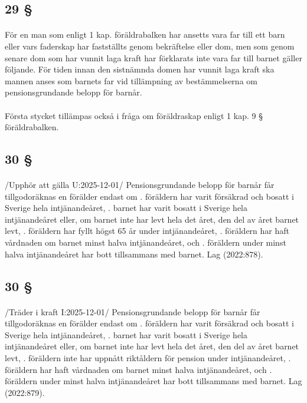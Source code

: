 \documentclass[a4paper,notitlepage,openany,10pt]{book}
\begin{document}
\subsection*{29 §}
\paragraph*{}
För en man som enligt 1 kap. föräldrabalken har ansetts vara far till ett barn eller vars faderskap har fastställts genom bekräftelse eller dom, men som genom senare dom som har vunnit laga kraft har förklarats inte vara far till barnet gäller följande. För tiden innan den sistnämnda domen har vunnit laga kraft ska mannen anses som barnets far vid tillämpning av bestämmelserna om pensionsgrundande belopp för barnår.
\paragraph*{}
Första stycket tillämpas också i fråga om föräldraskap enligt 1 kap. 9 § föräldrabalken.
\subsection*{30 §}
\paragraph*{}
/Upphör att gälla U:2025-12-01/
Pensionsgrundande belopp för barnår får tillgodoräknas en förälder endast om
. föräldern har varit försäkrad och bosatt i Sverige hela intjänandeåret,
. barnet har varit bosatt i Sverige hela intjänandeåret eller, om barnet inte har levt hela det året, den del av året barnet levt,
. föräldern har fyllt högst 65 år under intjänandeåret,
. föräldern har haft vårdnaden om barnet minst halva intjänandeåret, och
. föräldern under minst halva intjänandeåret har bott tillsammans med barnet.
Lag (2022:878).
\subsection*{30 §}
\paragraph*{}
/Träder i kraft I:2025-12-01/
Pensionsgrundande belopp för barnår får tillgodoräknas en förälder endast om
. föräldern har varit försäkrad och bosatt i Sverige hela intjänandeåret,
. barnet har varit bosatt i Sverige hela intjänandeåret eller, om barnet inte har levt hela det året, den del av året barnet levt,
. föräldern inte har uppnått riktåldern för pension under intjänandeåret,
. föräldern har haft vårdnaden om barnet minst halva intjänandeåret, och
. föräldern under minst halva intjänandeåret har bott tillsammans med barnet.
Lag (2022:879).
\end{document}
